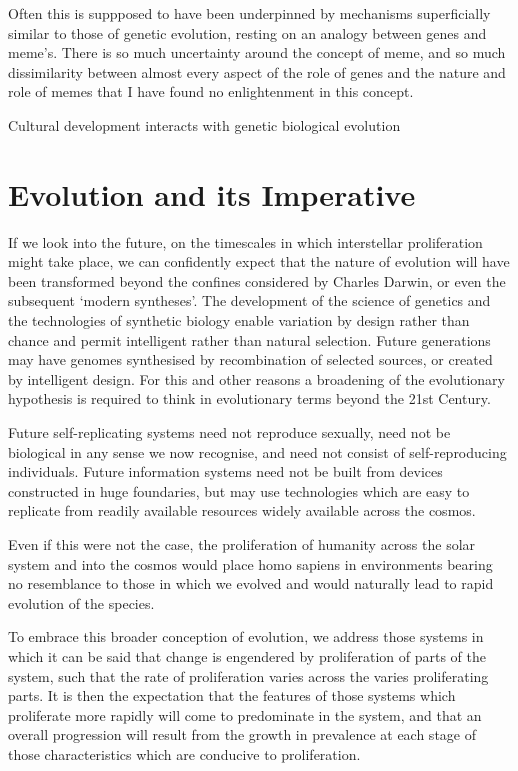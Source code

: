 Often this is suppposed to have been underpinned by mechanisms superficially similar to those of genetic evolution, resting on an analogy between genes and meme's.
There is so much uncertainty around the concept of meme, and so much dissimilarity between almost every aspect of the role of genes and the nature and role of memes that I have found no enlightenment in this concept.

Cultural development interacts with genetic biological evolution


\section{Evolution and its Imperative}

If we look into the future, on the timescales in which interstellar proliferation might take place, we can confidently expect that the nature of evolution will have been transformed beyond the confines considered by Charles Darwin, or even the subsequent `modern syntheses'.
The development of the science of genetics and the technologies of synthetic biology enable variation by design rather than chance and permit intelligent rather than natural selection.
Future generations may have genomes synthesised by recombination of selected sources, or created by intelligent design.
For this and other reasons a broadening of the evolutionary hypothesis is required to think in evolutionary terms beyond the 21st Century.

Future self-replicating systems need not reproduce sexually, need not be biological in any sense we now recognise, and need not consist of self-reproducing individuals.
Future information systems need not be built from devices constructed in huge foundaries, but may use technologies which are easy to replicate from readily available resources widely available across the cosmos.

Even if this were not the case, the proliferation of humanity across the solar system and into the cosmos would place homo sapiens in environments bearing no resemblance to those in which we evolved and would naturally lead to rapid evolution of the species.

To embrace this broader conception of evolution, we address those systems in which it can be said that change is engendered by proliferation of parts of the system, such that the rate of proliferation varies across the varies proliferating parts.
It is then the expectation that the features of those systems which proliferate more rapidly will come to predominate in the system, and that an overall progression will result from the growth in prevalence at each stage of those characteristics which are conducive to proliferation.

